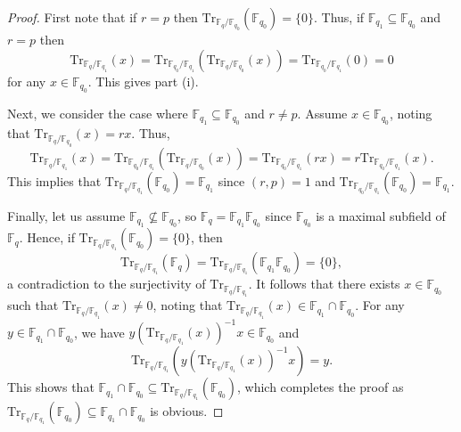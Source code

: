 \documentclass[twoside,a4paper,reqno,11pt]{amsart}
\newcommand{\<}{\langle}
\renewcommand{\>}{\rangle}
\newcommand{\Tr}{\mathrm{Tr}}
\theoremstyle{definition}
\begin{document}
	\begin{proof}
		First note that if $r = p$ then $\Tr_{\mathbb{F}_q/\mathbb{F}_{q_0}}(\mathbb{F}_{q_0}) = \{0\}$. Thus, if $\mathbb{F}_{q_1}\subseteq\mathbb{F}_{q_0}$ and $r = p$ then
		\begin{equation*}
		\Tr_{\mathbb{F}_q/\mathbb{F}_{q_1}}(x) = \Tr_{\mathbb{F}_{q_0}/\mathbb{F}_{q_1}}(\Tr_{\mathbb{F}_q/\mathbb{F}_{q_0}}(x)) = \Tr_{\mathbb{F}_{q_0}/\mathbb{F}_{q_1}}(0) = 0
		\end{equation*}
		for any $x\in\mathbb{F}_{q_0}$. This gives part (i).
		
		Next, we consider the case where $\mathbb{F}_{q_1}\subseteq\mathbb{F}_{q_0}$ and $r\ne p$. Assume $x\in\mathbb{F}_{q_0}$, noting that $\Tr_{\mathbb{F}_q/\mathbb{F}_{q_0}}(x) = rx$. Thus,
		\begin{equation*}
		\Tr_{\mathbb{F}_q/\mathbb{F}_{q_1}}(x) = \Tr_{\mathbb{F}_{q_0}/\mathbb{F}_{q_1}}(\Tr_{\mathbb{F}_q/\mathbb{F}_{q_0}}(x)) = \Tr_{\mathbb{F}_{q_0}/\mathbb{F}_{q_1}}(rx) = r\Tr_{\mathbb{F}_{q_0}/\mathbb{F}_{q_1}}(x).
		\end{equation*}
		This implies that $\Tr_{\mathbb{F}_q/\mathbb{F}_{q_1}}(\mathbb{F}_{q_0}) = \mathbb{F}_{q_1}$ since $(r,p) = 1$ and $\Tr_{\mathbb{F}_{q_0}/\mathbb{F}_{q_1}}(\mathbb{F}_{q_0}) = \mathbb{F}_{q_1}$.
		
		Finally, let us assume $\mathbb{F}_{q_1}\not\subseteq\mathbb{F}_{q_0}$, so $\mathbb{F}_q = \mathbb{F}_{q_1}\mathbb{F}_{q_0}$ since $\mathbb{F}_{q_0}$ is a maximal subfield of $\mathbb{F}_q$. Hence, if $\Tr_{\mathbb{F}_q/\mathbb{F}_{q_1}}(\mathbb{F}_{q_0}) = \{0\}$, then
		\begin{equation*}
		\Tr_{\mathbb{F}_q/\mathbb{F}_{q_1}}(\mathbb{F}_q) = \Tr_{\mathbb{F}_q/\mathbb{F}_{q_1}}(\mathbb{F}_{q_1}\mathbb{F}_{q_0}) = \{0\},
		\end{equation*}
		a contradiction to the surjectivity of $\Tr_{\mathbb{F}_q/\mathbb{F}_{q_1}}$. It follows that there exists $x\in\mathbb{F}_{q_0}$ such that $\Tr_{\mathbb{F}_q/\mathbb{F}_{q_1}}(x)\ne 0$, noting that $\Tr_{\mathbb{F}_q/\mathbb{F}_{q_1}}(x)\in\mathbb{F}_{q_1}\cap\mathbb{F}_{q_0}$. For any $y\in\mathbb{F}_{q_1}\cap\mathbb{F}_{q_0}$, we have $y(\Tr_{\mathbb{F}_q/\mathbb{F}_{q_1}}(x))^{-1}x\in\mathbb{F}_{q_0}$ and
		\begin{equation*}
		\Tr_{\mathbb{F}_q/\mathbb{F}_{q_1}}(y(\Tr_{\mathbb{F}_q/\mathbb{F}_{q_1}}(x))^{-1}x) = y.
		\end{equation*}
		This shows that $\mathbb{F}_{q_1}\cap\mathbb{F}_{q_0}\subseteq\Tr_{\mathbb{F}_q/\mathbb{F}_{q_1}}(\mathbb{F}_{q_0})$, which completes the proof as $\Tr_{\mathbb{F}_q/\mathbb{F}_{q_1}}(\mathbb{F}_{q_0})\subseteq\mathbb{F}_{q_1}\cap\mathbb{F}_{q_0}$ is obvious.
	\end{proof}
	
\end{document}
